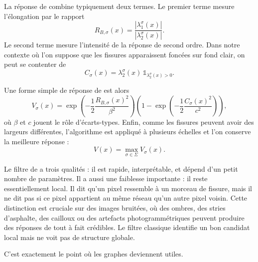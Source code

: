 La réponse de \Frangi{} combine typiquement deux termes. Le premier terme mesure l'élongation par le rapport
\begin{equation}
    R_{B,\sigma}(x)
    =
    \frac{|\lambda_1^\sigma(x)|}{|\lambda_2^\sigma(x)|}.
    \label{eq:chapIII_frangi_ratio}
\end{equation}
Le second terme mesure l'intensité de la réponse de second ordre. Dans notre contexte où l'on suppose que les fissures apparaissent foncées sur fond clair, on peut se contenter de
\begin{equation}
    C_\sigma(x)
    =
    \lambda_2^\sigma(x)\,\mathds{1}_{\lambda_2^\sigma(x)>0}.
    \label{eq:chapIII_curvature_positive}
\end{equation}



Une forme simple de réponse de \Frangi{} est alors
\begin{equation}
    V_\sigma(x)
    =
    \exp\left(-\frac12\frac{R_{B,\sigma}(x)^2}{\beta^2}\right)
    \left(1-\exp\left(-\frac12\frac{C_\sigma(x)^2}{c^2}\right)\right),
    \label{eq:chapIII_frangi_response}
\end{equation}
où $\beta$ et $c$ jouent le rôle d'écarts-types. Enfin, comme les fissures peuvent avoir des largeurs différentes, l'algorithme est appliqué à plusieurs échelles et l'on conserve la meilleure réponse :
\begin{equation}
    V(x)=\max_{\sigma\in\Sigma} V_\sigma(x).
\end{equation}

Le filtre de \Frangi{} a trois qualités : il est rapide, interprétable, et dépend d'un petit nombre de paramètres. Il a aussi une faiblesse importante : il reste essentiellement local. Il dit qu'un pixel ressemble à un morceau de fissure, mais il ne dit pas si ce pixel appartient au même réseau qu'un autre pixel voisin. Cette distinction est cruciale sur des images bruitées, où des ombres, des stries d'asphalte, des cailloux ou des artefacts photogrammétriques peuvent produire des réponses de \Frangi{} tout à fait crédibles. Le filtre classique identifie un bon candidat local mais ne voit pas de structure globale.

C'est exactement le point où les graphes deviennent utiles.

